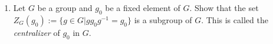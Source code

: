 \documentclass[12pt]{article}
\theoremstyle{plain}
\theoremstyle{definition}
\theoremstyle{remark}
\newcommand{\rw}{\rightarrow}
\begin{document}
\begin{enumerate}
\item Let $G$ be a group and $g_0$ be a fixed element of $G$. Show that the set $Z_G(g_0):=\{g\in G|gg_0g^{-1}=g_0\}$ is a subgroup of $G$. This is called the \emph{centralizer} of $g_0$ in $G$.
\end{enumerate}
\end{document}
